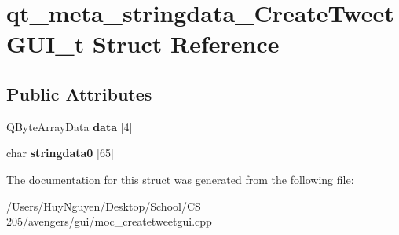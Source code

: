 \hypertarget{structqt__meta__stringdata__CreateTweetGUI__t}{}\section{qt\+\_\+meta\+\_\+stringdata\+\_\+\+Create\+Tweet\+G\+U\+I\+\_\+t Struct Reference}
\label{structqt__meta__stringdata__CreateTweetGUI__t}
\subsection*{Public Attributes}
\begin{DoxyCompactItemize}
\item 
Q\+Byte\+Array\+Data {\bfseries data} \mbox{[}4\mbox{]}\hypertarget{structqt__meta__stringdata__CreateTweetGUI__t_aa9de67f1910676c765445a0d59258904}{}\label{structqt__meta__stringdata__CreateTweetGUI__t_aa9de67f1910676c765445a0d59258904}

\item 
char {\bfseries stringdata0} \mbox{[}65\mbox{]}\hypertarget{structqt__meta__stringdata__CreateTweetGUI__t_aae653181ab66a342e088cf25beceeb8d}{}\label{structqt__meta__stringdata__CreateTweetGUI__t_aae653181ab66a342e088cf25beceeb8d}

\end{DoxyCompactItemize}


The documentation for this struct was generated from the following file\+:\begin{DoxyCompactItemize}
\item 
/\+Users/\+Huy\+Nguyen/\+Desktop/\+School/\+C\+S 205/avengers/gui/moc\+\_\+createtweetgui.\+cpp\end{DoxyCompactItemize}
